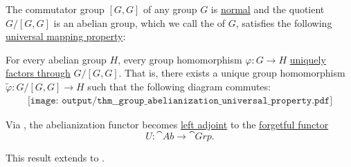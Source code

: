 \begin{theorem}\label{thm:group_abelianization_universal_property}
  The commutator group \( [G, G] \) of any group \( G \) is \hyperref[thm:normal_subgroup_equivalences]{normal} and the quotient \( G / [G, G] \) is an abelian group, which we call the  of \( G \), satisfies the following \hyperref[rem:universal_mapping_property]{universal mapping property}:
  \begin{displayquote}
    For every abelian group \( H \), every group homomorphism \( \varphi: G \to H \) \hyperref[def:factors_through]{uniquely factors through} \( G / [G, G] \). That is, there exists a unique group homomorphism \( \widetilde{\varphi}: G / [G, G] \to H \) such that the following diagram commutes:
    \begin{equation}\label{eq:thm:group_abelianization_universal_property/diagram}
      \begin{aligned}
        \texttt{[image: output/thm\_\_group\_abelianization\_universal\_property.pdf]}
      \end{aligned}
    \end{equation}
  \end{displayquote}

  Via , the abelianization functor becomes \hyperref[def:category_adjunction]{left adjoint} to the \hyperref[def:concrete_category]{forgetful functor}
  \begin{equation*}
    U: \cat{Ab} \to \cat{Grp}.
  \end{equation*}

  This result extends to .
\end{theorem}
